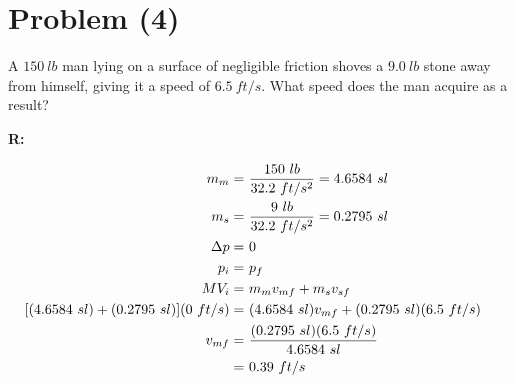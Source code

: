 \section{Problem (4)}

	A $150 \ lb$ man lying on a surface of negligible friction shoves a $9.0 \ lb$ stone away from himself, giving it a speed of $6.5 \ ft/s$. What speed does the man acquire as a result?

	\textbf{R:}

	\begin{align}
		m_{m} = \ &\frac{150 \ lb}{32.2 \ ft/s^{2}} = 4.6584 \ sl& \notag \\
		m_{s} = \ &\frac{9 \ lb}{32.2 \ ft/s^{2}} = 0.2795 \ sl& \notag \\
		\Delta p = \ &0& \notag \\
		p_{i} = \ &p_{f}& \notag \\
		MV_{i} = \ &m_{m}v_{mf} + m_{s}v_{sf}& \notag \\
		[(4.6584 \ sl) + (0.2795 \ sl)](0 \ ft/s) = \ &(4.6584 \ sl)v_{mf} + (0.2795 \ sl)(6.5 \ ft/s)& \notag \\
		v_{mf} = \ &\frac{(0.2795 \ sl)(6.5 \ ft/s)}{4.6584 \ sl}& \notag \\
		= \ &0.39 \ ft/s&
	\end{align}
